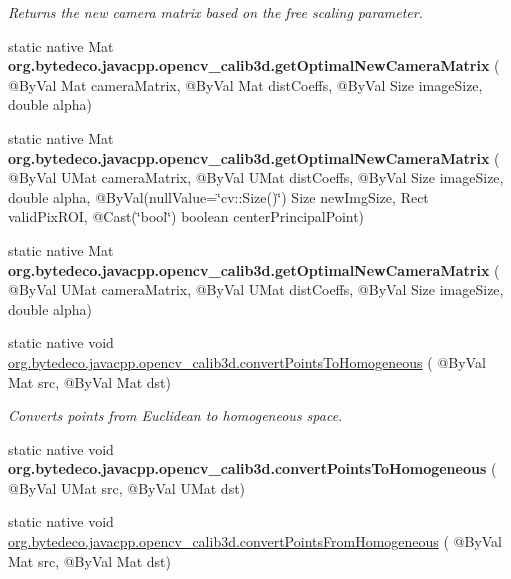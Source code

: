 \begin{DoxyCompactItemize}
\begin{DoxyCompactList}\small\item\em Returns the new camera matrix based on the free scaling parameter. \end{DoxyCompactList}\item 
\mbox{\label{group__calib3d_ga234ca2b40668329f15397d889fc3fe2f}} 
static native Mat {\bfseries org.\+bytedeco.\+javacpp.\+opencv\+\_\+calib3d.\+get\+Optimal\+New\+Camera\+Matrix} ( @By\+Val Mat camera\+Matrix, @By\+Val Mat dist\+Coeffs, @By\+Val Size image\+Size, double alpha)
\item 
\mbox{\label{group__calib3d_ga3fbd9bd21e0f29babcb1e4555c3331d0}} 
static native Mat {\bfseries org.\+bytedeco.\+javacpp.\+opencv\+\_\+calib3d.\+get\+Optimal\+New\+Camera\+Matrix} ( @By\+Val U\+Mat camera\+Matrix, @By\+Val U\+Mat dist\+Coeffs, @By\+Val Size image\+Size, double alpha, @By\+Val(null\+Value=\char`\"{}cv\+::\+Size()\char`\"{}) Size new\+Img\+Size, Rect valid\+Pix\+R\+OI, @Cast(\char`\"{}bool\char`\"{}) boolean center\+Principal\+Point)
\item 
\mbox{\label{group__calib3d_gadb46dcf5a338d65e1d2c3d714945b5dd}} 
static native Mat {\bfseries org.\+bytedeco.\+javacpp.\+opencv\+\_\+calib3d.\+get\+Optimal\+New\+Camera\+Matrix} ( @By\+Val U\+Mat camera\+Matrix, @By\+Val U\+Mat dist\+Coeffs, @By\+Val Size image\+Size, double alpha)
\item 
static native void \hyperlink{group__calib3d_gaaf5de214950c5c904cd996ac5f73bff6}{org.\+bytedeco.\+javacpp.\+opencv\+\_\+calib3d.\+convert\+Points\+To\+Homogeneous} ( @By\+Val Mat src, @By\+Val Mat dst)
\begin{DoxyCompactList}\small\item\em Converts points from Euclidean to homogeneous space. \end{DoxyCompactList}\item 
\mbox{\label{group__calib3d_gaf23d0d3475f2551af8dc44072fc59f63}} 
static native void {\bfseries org.\+bytedeco.\+javacpp.\+opencv\+\_\+calib3d.\+convert\+Points\+To\+Homogeneous} ( @By\+Val U\+Mat src, @By\+Val U\+Mat dst)
\item 
static native void \hyperlink{group__calib3d_ga8d818140f4ee16a68518f61d0dbc2de9}{org.\+bytedeco.\+javacpp.\+opencv\+\_\+calib3d.\+convert\+Points\+From\+Homogeneous} ( @By\+Val Mat src, @By\+Val Mat dst)

\end{DoxyCompactItemize}
